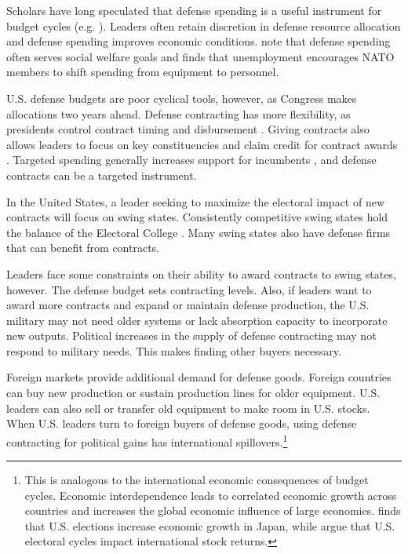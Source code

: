 \documentclass[12pt]{article}
\begin{document}
Scholars have long speculated that defense spending is a useful instrument for budget cycles (e.g. \cite{Tufte1978, Mintz1988}).
Leaders often retain discretion in defense resource allocation and defense spending improves economic conditions.
\citet{WhittenWilliams2011} note that defense spending often serves social welfare goals and \citet{Becker2021} finds that unemployment encourages NATO members to shift spending from equipment to personnel.


U.S. defense budgets are poor cyclical tools, however, as Congress makes allocations two years ahead.
Defense contracting has more flexibility, as presidents control contract timing and disbursement \citep{Mayer1995, DerouenHeo2000}.
Giving contracts also allows leaders to focus on key constituencies and claim credit for contract awards \citep{DerouenHeo2000}. 
Targeted spending generally increases support for incumbents \citep{KrinerReeves2012}, and defense contracts can be a targeted instrument.


In the United States, a leader seeking to maximize the electoral impact of new contracts will focus on swing states.
Consistently competitive swing states hold the balance of the Electoral College \citep{KrinerReeves2015}. 
Many swing states also have defense firms that can benefit from contracts. 


Leaders face some constraints on their ability to award contracts to swing states, however. 
The defense budget sets contracting levels. 
Also, if leaders want to award more contracts and expand or maintain defense production, the U.S. military may not need older systems or lack absorption capacity to incorporate new outputs.
Political increases in the supply of defense contracting may not respond to military needs.
This makes finding other buyers necessary.


Foreign markets provide additional demand for defense goods.
Foreign countries can buy new production or sustain production lines for older equipment. 
U.S. leaders can also sell or transfer old equipment to make room in U.S. stocks. 
When U.S. leaders turn to foreign buyers of defense goods, using defense contracting for political gains has international spillovers.\footnote{%
This is analogous to the international economic consequences of budget cycles.
Economic interdependence leads to correlated economic growth across countries \citep{Kayser2006} and increases the global economic influence of large economies. 
\citet{Ito1991} finds that U.S. elections increase economic growth in Japan, while \citet{FoersterSchmitz1997} argue that U.S. electoral cycles impact international stock returns.
}
\end{document}
